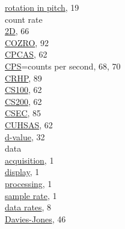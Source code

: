 \documentclass[
]{article}
\begin{document}
\hspace*{0.333em}\hspace*{0.333em}\hspace*{0.333em}\hspace*{0.333em}\href{./4-the-state-of-the-atmosphere.html\#wind}{rotation
in pitch}, 19\\
count rate\\
\hspace*{0.333em}\hspace*{0.333em}\href{./5-cloud-physics-variables.html\#a1dc-a1dp}{2D},
66\\
\href{./10-obsolete-variables.html\#co-vars}{COZRO}, 92\\
\href{./5-cloud-physics-variables.html\#size-distribution}{CPCAS}, 62\\
\href{./5-cloud-physics-variables.html\#a1dc-a1dp}{CPS}=counts per
second, 68, 70\\
\href{./10-obsolete-variables.html\#cryo-hygro}{CRHP}, 89\\
\href{./5-cloud-physics-variables.html\#size-distribution}{CS100}, 62\\
\href{./5-cloud-physics-variables.html\#size-distribution}{CS200}, 62\\
\href{./10-obsolete-variables.html\#loranc}{CSEC}, 85\\
\href{./5-cloud-physics-variables.html\#size-distribution}{CUHSAS}, 62\\
\href{./4-the-state-of-the-atmosphere.html\#dvalue}{d-value}, 32\\
data\\
\hspace*{0.333em}\hspace*{0.333em}\href{./1-introduction.html}{acquisition},
1\\
\hspace*{0.333em}\hspace*{0.333em}\href{./1-introduction.html}{display},
1\\
\hspace*{0.333em}\hspace*{0.333em}\href{./1-introduction.html}{processing},
1\\
\hspace*{0.333em}\hspace*{0.333em}\href{./1-introduction.html}{sample
rate}, 1\\
\href{./1-introduction.html}{data rates}, 8\\
\href{./4-the-state-of-the-atmosphere.html\#thetae}{Davies-Jones}, 46\\
\end{document}

